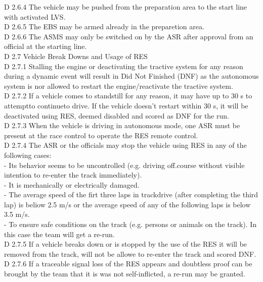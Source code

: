 \documentclass{article}
\begin{document}
D 2.6.4 The vehicle may be pushed from the preparation area to the start line with activated LVS.\\

D 2.6.5 The EBS  may be armed already in the preparetion area.\\

D 2.6.6 The ASMS may only be switched on by the ASR after approval from an official at the starting line.\\

D 2.7 Vehicle Break Downs and Usage of RES\\

D 2.7.1 Stalling the engine or deactivating the tractive system for any reason during a dynamic event will result in Did Not Finished (DNF) as the autonomous system is nor allowed to restart the engine/reactivate the tractive system.\\

D 2.7.2 If a vehicle comes to standstill for any reason, it may have up to 30 s to attemptto continueto drive. If the vehicle doesn't restart within 30 s, it will be deactivated using RES, deemed disabled and scored as DNF for the run.\\

D 2.7.3 When the vehicle is driving in autonomous mode, one ASR must be present at the race control to operate the RES remote control.\\

D 2.7.4 The ASR or the officials may stop the vehicle using RES in any of the following cases:\\
	- Its behavior seems to be uncontrolled (e.g. driving off.course without visible intention to re-enter the track immediately).\\
	- It is mechanically or electrically damaged.\\
	- The average speed of the firt three laps in trackdrive (after completing the third lap) is beliow 2.5 m/s or the average speed of any of the following laps is below 3.5 m/s.\\
	- To ensure safe conditions on the track (e.g. persons or animals on the track). In this case the team will get a re-run.\\

D 2.7.5 If a vehicle breaks down or is stopped by the use of the RES it will be removed from the track, will not be allowe to re-enter the track and scored DNF.\\

D 2.7.6 If a traceable signal loss of the RES appears and doubtless proof can be brought by the team that it is was not self-inflicted, a re-run may be granted.\\
\end{document}
